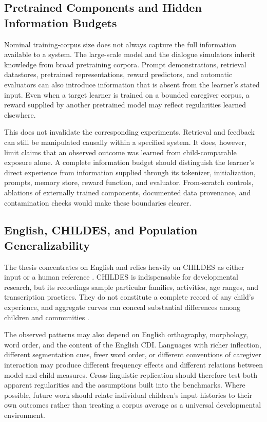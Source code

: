 \subsection{Pretrained Components and Hidden Information Budgets}

Nominal training-corpus size does not always capture the full information available to a system. The large-scale model and the dialogue simulators inherit knowledge from broad pretraining corpora. Prompt demonstrations, retrieval datastores, pretrained representations, reward predictors, and automatic evaluators can also introduce information that is absent from the learner's stated input. Even when a target learner is trained on a bounded caregiver corpus, a reward supplied by another pretrained model may reflect regularities learned elsewhere.

This does not invalidate the corresponding experiments. Retrieval and feedback can still be manipulated causally within a specified system. It does, however, limit claims that an observed outcome was learned from child-comparable exposure alone. A complete information budget should distinguish the learner's direct experience from information supplied through its tokenizer, initialization, prompts, memory store, reward function, and evaluator. From-scratch controls, ablations of externally trained components, documented data provenance, and contamination checks would make these boundaries clearer.

\subsection{English, CHILDES, and Population Generalizability}

The thesis concentrates on English and relies heavily on CHILDES as either input or a human reference \citep{macwhinney2000childes}. CHILDES is indispensable for developmental research, but its recordings sample particular families, activities, age ranges, and transcription practices. They do not constitute a complete record of any child's experience, and aggregate curves can conceal substantial differences among children and communities \citep{WeislederFernald2013,bergelson2023everyday}.

The observed patterns may also depend on English orthography, morphology, word order, and the content of the English CDI. Languages with richer inflection, different segmentation cues, freer word order, or different conventions of caregiver interaction may produce different frequency effects and different relations between model and child measures. Cross-linguistic replication should therefore test both apparent regularities and the assumptions built into the benchmarks. Where possible, future work should relate individual children's input histories to their own outcomes rather than treating a corpus average as a universal developmental environment.

